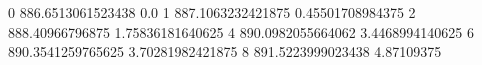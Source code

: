 0 886.6513061523438 0.0
1 887.1063232421875 0.45501708984375
2 888.40966796875 1.75836181640625
4 890.0982055664062 3.4468994140625
6 890.3541259765625 3.70281982421875
8 891.5223999023438 4.87109375

